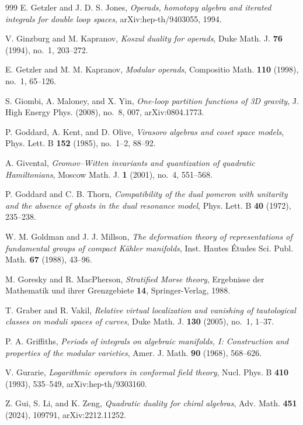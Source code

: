 \begin{thebibliography}{999}
E. Getzler and J. D. S. Jones, \emph{Operads, homotopy algebra and iterated integrals for double loop spaces}, arXiv:hep-th/9403055, 1994.

V. Ginzburg and M. Kapranov, \emph{Koszul duality for operads}, Duke Math. J. \textbf{76} (1994), no.~1, 203--272.

E. Getzler and M. M. Kapranov, \emph{Modular operads}, Compositio Math. \textbf{110} (1998), no.~1, 65--126.

S. Giombi, A. Maloney, and X. Yin, \emph{One-loop partition functions of 3D gravity}, J. High Energy Phys. (2008), no.~8, 007, arXiv:0804.1773.

P. Goddard, A. Kent, and D. Olive, \emph{Virasoro algebras and coset space models}, Phys. Lett. B \textbf{152} (1985), no.~1--2, 88--92.

A. Givental, \emph{Gromov--Witten invariants and quantization of quadratic Hamiltonians}, Moscow Math. J. \textbf{1} (2001), no.~4, 551--568.

P. Goddard and C. B. Thorn, \emph{Compatibility of the dual pomeron with unitarity and the absence of ghosts in the dual resonance model}, Phys. Lett. B \textbf{40} (1972), 235--238.

W. M. Goldman and J. J. Millson, \emph{The deformation theory of representations of fundamental groups of compact K\"ahler manifolds}, Inst. Hautes \'Etudes Sci. Publ. Math. \textbf{67} (1988), 43--96.

M. Goresky and R. MacPherson, \emph{Stratified Morse theory}, Ergebnisse der Mathematik und ihrer Grenzgebiete \textbf{14}, Springer-Verlag, 1988.

T. Graber and R. Vakil, \emph{Relative virtual localization and vanishing of tautological classes on moduli spaces of curves}, Duke Math. J. \textbf{130} (2005), no.~1, 1--37.

P. A. Griffiths, \emph{Periods of integrals on algebraic manifolds, I: Construction and properties of the modular varieties}, Amer. J. Math. \textbf{90} (1968), 568--626.

V. Gurarie, \emph{Logarithmic operators in conformal field theory}, Nucl. Phys. B \textbf{410} (1993), 535--549, arXiv:hep-th/9303160.

Z. Gui, S. Li, and K. Zeng, \emph{Quadratic duality for chiral algebras}, Adv. Math. \textbf{451} (2024), 109791, arXiv:2212.11252.


\end{thebibliography}
